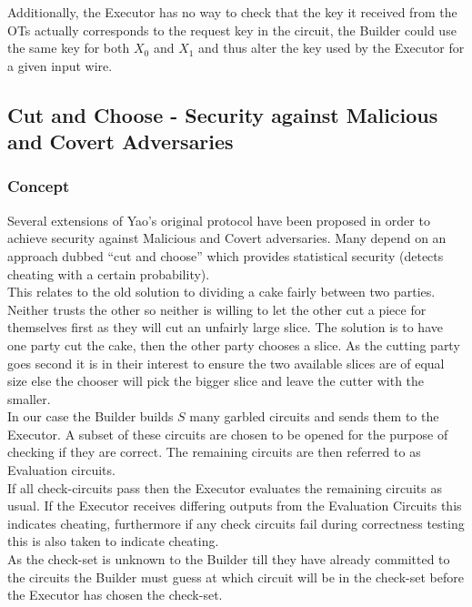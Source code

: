 \documentclass[ %
                    author={Nicholas Tutte},
                supervisor={Prof. Nigel Smart},
                    degree={MEng},
                     title={Secure Two Party Computation},
                  subtitle={A practical comparison of recent protocols},
                      type={Research - GG1K},
                      year={2015} ]{dissertation}
\begin{document}
			Additionally, the Executor has no way to check that the key it received from the OTs actually corresponds to the request key in the circuit, the Builder could use the same key for both $X_0$ and $X_1$ and thus alter the key used by the Executor for a given input wire.


		\subsection{Cut and Choose - Security against Malicious and Covert Adversaries} \label{sub:YaoMalicious}
			\subsubsection{Concept}
				Several extensions of Yao's original protocol have been proposed in order to achieve security against Malicious and Covert adversaries. Many depend on an approach dubbed ``cut and choose'' which provides statistical security (detects cheating with a certain probability).\\

				This relates to the old solution to dividing a cake fairly between two parties. Neither trusts the other so neither is willing to let the other cut a piece for themselves first as they will cut an unfairly large slice. The solution is to have one party cut the cake, then the other party chooses a slice. As the cutting party goes second it is in their interest to ensure the two available slices are of equal size else the chooser will pick the bigger slice and leave the cutter with the smaller.\\

				In our case the Builder builds $S$ many garbled circuits and sends them to the Executor. A subset of these circuits are chosen to be opened for the purpose of checking if they are correct. The remaining circuits are then referred to as Evaluation circuits.\\

				If all check-circuits pass then the Executor evaluates the remaining circuits as usual. If the Executor receives differing outputs from the Evaluation Circuits this indicates cheating, furthermore if any check circuits fail during correctness testing this is also taken to indicate cheating.\\

				As the check-set is unknown to the Builder till they have already committed to the circuits the Builder must guess at which circuit will be in the check-set before the Executor has chosen the check-set.\\
\end{document}
